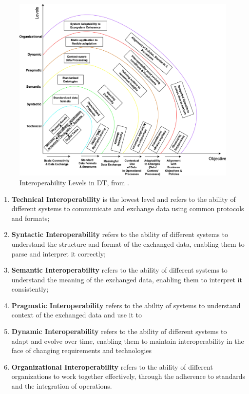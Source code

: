 \begin{figure}[t]
    \centering
    \includegraphics[width=\textwidth]{figures/interoperability-levels.jpg}
    \caption{Interoperability Levels in \acl{DT}, from \cite{Acharya_Khan_Päivärinta_2024}.}
    \label{fig:dt-interoperability-levels}
\end{figure}


\begin{enumerate}
    \item \textbf{Technical Interoperability} is the lowest level and refers to the ability of different systems to communicate and exchange data using common protocols and formats;
    \item \textbf{Syntactic Interoperability} refers to the ability of different systems to understand the structure and format of the exchanged data, enabling them to parse and interpret it correctly;
    \item \textbf{Semantic Interoperability} refers to the ability of different systems to understand the meaning of the exchanged data, enabling them to interpret it consistently;
    \item \textbf{Pragmatic Interoperability} refers to the ability of systems to understand context of the exchanged data and use it to 
    \item \textbf{Dynamic Interoperability} refers to the ability of different systems to adapt and evolve over time, enabling them to maintain interoperability in the face of changing requirements and technologies
    \item \textbf{Organizational Interoperability} refers to the ability of different organizations to work together effectively, through the adherence to standards and the integration of operations. 
\end{enumerate}
%

